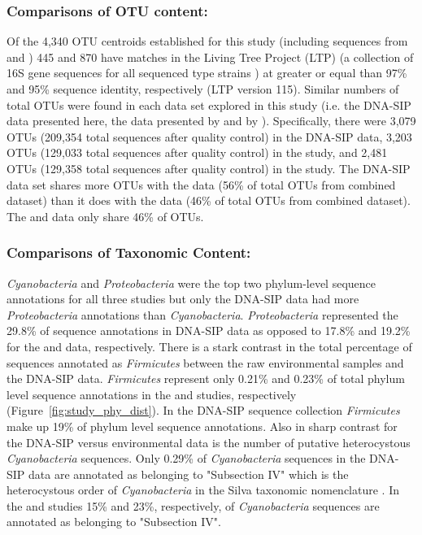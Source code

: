 \subsubsection{Comparisons of OTU content:} Of the 4,340 OTU centroids
established for this study (including sequences from \citet{Steven_2013} and
\citet{Garcia_Pichel_2013}) 445 and 870 have matches in the Living Tree
Project (LTP) (a collection of 16S gene sequences for all sequenced type
strains \citep{Yarza_2008}) at greater or equal than 97\% and 95\% sequence
identity, respectively (LTP version 115). Similar numbers of total OTUs were
found in each data set explored in this study (i.e. the DNA-SIP data
presented here, the data presented by \citet{Steven_2013} and by
\citet{Garcia_Pichel_2013}). Specifically, there were 3,079 OTUs (209,354
total sequences after quality control) in the DNA-SIP data, 3,203 OTUs
(129,033 total sequences after quality control) in the
\citet{Garcia_Pichel_2013} study, and 2,481 OTUs (129,358 total sequences
after quality control) in the \citet{Steven_2013} study. The DNA-SIP data set
shares more OTUs with the \citet{Steven_2013} data (56\% of total OTUs from
combined dataset) than it does with the \citet{Garcia_Pichel_2013} data (46\%
of total OTUs from combined dataset). The \citet{Steven_2013} and
\citet{Garcia_Pichel_2013} data only share 46\% of OTUs.

\subsubsection{Comparisons of Taxonomic Content:} \textit{Cyanobacteria} and
\textit{Proteobacteria} were the top two phylum-level sequence annotations
for all three studies but only the DNA-SIP data had more
\textit{Proteobacteria} annotations than \textit{Cyanobacteria}.
\textit{Proteobacteria} represented the 29.8\% of sequence annotations in
DNA-SIP data as opposed to 17.8\% and 19.2\% for the \citet{Garcia_Pichel_2013}
and \citet{Steven_2013} data, respectively.  There is a stark contrast in the
total percentage of sequences annotated as \textit{Firmicutes} between the raw
environmental samples and the DNA-SIP data. \textit{Firmicutes} represent only
0.21\% and 0.23\% of total phylum level sequence annotations in the
\citet{Steven_2013} and \citet{Garcia_Pichel_2013} studies, respectively
(Figure~\ref{fig:study_phy_dist}). In the DNA-SIP sequence collection
\textit{Firmicutes} make up 19\% of phylum level sequence annotations. Also in
sharp contrast for the DNA-SIP versus environmental data is the number of
putative heterocystous \textit{Cyanobacteria} sequences. Only 0.29\% of
\textit{Cyanobacteria} sequences in the DNA-SIP data are annotated as belonging
to "Subsection IV" which is the heterocystous order of \textit{Cyanobacteria}
in the Silva taxonomic nomenclature \citep{17947321}. In the
\citet{Steven_2013} and \citet{Garcia_Pichel_2013} studies 15\% and 23\%,
respectively, of \textit{Cyanobacteria} sequences are annotated as belonging to
"Subsection
IV".  

